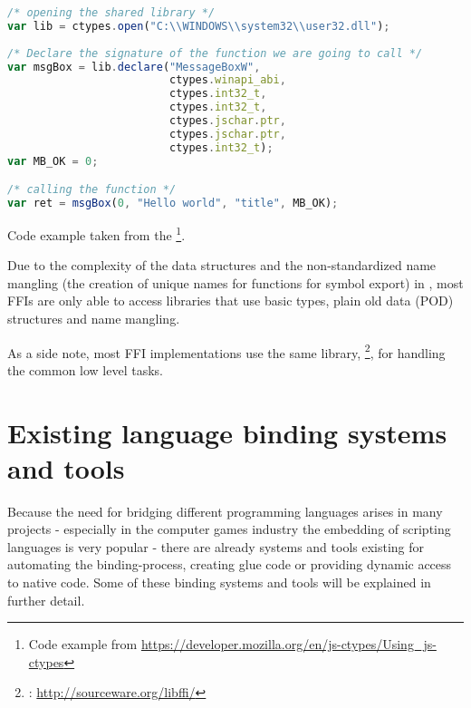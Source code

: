 \SingleSpacing
\begin{lstlisting}[language=JavaScript, caption={Exposing a \myProperName{C} function to \myProperName{JavaScript} using \myProperName{js-ctypes}}]
/* opening the shared library */
var lib = ctypes.open("C:\\WINDOWS\\system32\\user32.dll");  
  
/* Declare the signature of the function we are going to call */  
var msgBox = lib.declare("MessageBoxW",  
                         ctypes.winapi_abi,  
                         ctypes.int32_t,  
                         ctypes.int32_t,  
                         ctypes.jschar.ptr,  
                         ctypes.jschar.ptr,  
                         ctypes.int32_t);  
var MB_OK = 0;  

/* calling the function */
var ret = msgBox(0, "Hello world", "title", MB_OK); 
\end{lstlisting}
\OnehalfSpacing

Code example taken from the \footnote{Code example from \url{https://developer.mozilla.org/en/js-ctypes/Using_js-ctypes}}.

Due to the complexity of the data structures and the non-standardized name mangling (the creation of unique names for functions for symbol export) in , most FFIs are only able to access libraries that use basic  types, plain old data (POD) structures and  name mangling.

As a side note, most FFI implementations use the same library, \footnote{: \url{http://sourceware.org/libffi/}}, for handling the common low level tasks.


\section{Existing language binding systems and tools}

Because the need for bridging different programming languages arises in many projects - especially in the computer games industry the embedding of scripting languages is very popular - there are already systems and tools existing for automating the binding-process, creating glue code or providing dynamic access to native code. Some of these binding systems and tools will be explained in further detail.

